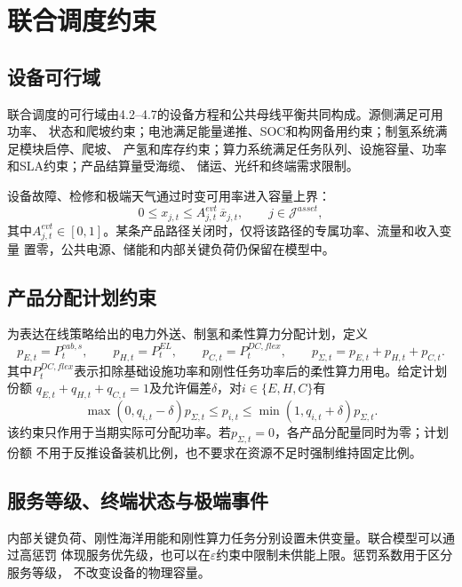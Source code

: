 \section{联合调度约束}
\label{sec:constraints}

\subsection{设备可行域}

联合调度的可行域由4.2--4.7的设备方程和公共母线平衡共同构成。源侧满足可用功率、
状态和爬坡约束；电池满足能量递推、SOC和构网备用约束；制氢系统满足模块启停、爬坡、
产氢和库存约束；算力系统满足任务队列、设施容量、功率和SLA约束；产品结算量受海缆、
储运、光纤和终端需求限制。

设备故障、检修和极端天气通过时变可用率进入容量上界：
\begin{equation}
0\le x_{j,t}\le A_{j,t}^{evt}\,\overline x_{j,t},
\qquad j\in\mathcal J^{asset},
\label{eq:availability-general}
\end{equation}
其中$A_{j,t}^{evt}\in[0,1]$。某条产品路径关闭时，仅将该路径的专属功率、流量和收入变量
置零，公共电源、储能和内部关键负荷仍保留在模型中。

\subsection{产品分配计划约束}

为表达在线策略给出的电力外送、制氢和柔性算力分配计划，定义
\begin{equation}
p_{E,t}=P_t^{cab,s},\qquad
p_{H,t}=P_t^{EL},\qquad
p_{C,t}=P_t^{DC,flex},\qquad
p_{\Sigma,t}=p_{E,t}+p_{H,t}+p_{C,t}.
\label{eq:hourly-mix-def}
\end{equation}
其中$P_t^{DC,flex}$表示扣除基础设施功率和刚性任务功率后的柔性算力用电。给定计划份额
$q_{E,t}+q_{H,t}+q_{C,t}=1$及允许偏差$\delta$，对$i\in\{E,H,C\}$有
\begin{equation}
\max(0,q_{i,t}-\delta)p_{\Sigma,t}
\le p_{i,t}\le
\min(1,q_{i,t}+\delta)p_{\Sigma,t}.
\label{eq:hourly-mix}
\end{equation}
该约束只作用于当期实际可分配功率。若$p_{\Sigma,t}=0$，各产品分配量同时为零；计划份额
不用于反推设备装机比例，也不要求在资源不足时强制维持固定比例。

\subsection{服务等级、终端状态与极端事件}

内部关键负荷、刚性海洋用能和刚性算力任务分别设置未供变量。联合模型可以通过高惩罚
体现服务优先级，也可以在$\varepsilon$约束中限制未供能上限。惩罚系数用于区分服务等级，
不改变设备的物理容量。

